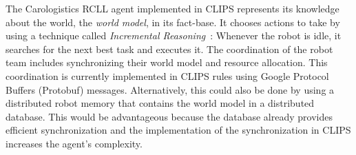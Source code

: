 \documentclass[a4paper,11pt]{article}
\begin{document}
The Carologistics RCLL agent implemented in CLIPS represents its
knowledge about the world, the \emph{world model}, in its
fact-base. It chooses actions to take by using a
technique called \emph{Incremental Reasoning}~\cite{CLIPS-Agent}:
Whenever the robot is idle, it searches for the
next best task and executes it.
The coordination
of the robot team includes synchronizing their world model
and resource allocation.
This coordination is currently implemented in CLIPS rules using Google
Protocol Buffers (Protobuf) messages. Alternatively, this could also
be done by using a distributed robot memory that contains the world
model in a distributed database. This would be advantageous because
the database already provides efficient synchronization and the
implementation of the synchronization in CLIPS increases the agent's
complexity.
\end{document}
